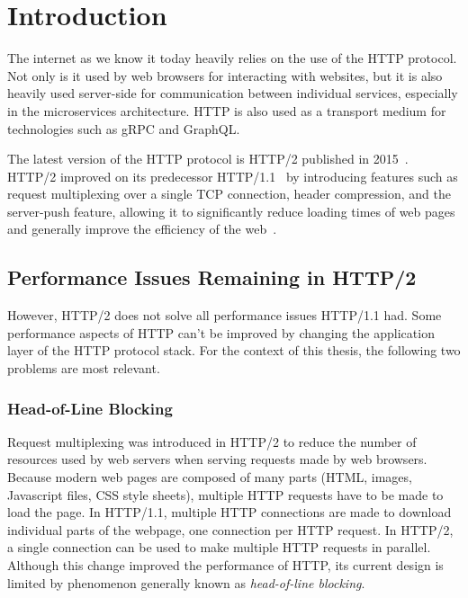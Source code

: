 \chapter{Introduction}

The internet as we know it today heavily relies on the use of the HTTP protocol. Not only is it used
by web browsers for interacting with websites, but it is also heavily used server-side for
communication between individual services, especially in the microservices architecture. HTTP is
also used as a transport medium for technologies such as gRPC and GraphQL\@. 

The latest version of the HTTP protocol is HTTP/2 published in 2015~\cite{rfc7540}. HTTP/2
improved on its predecessor HTTP/1.1~\cite{rfc7230} by introducing features such as request
multiplexing over a single TCP connection, header compression, and the server-push feature, allowing
it to significantly reduce loading times of web pages and generally improve the efficiency of the
web~\cite{deSaxce2015}.

\section{Performance Issues Remaining in HTTP/2}

However, HTTP/2 does not solve all performance issues HTTP/1.1 had. Some performance aspects of HTTP
can't be improved by changing the application layer of the HTTP protocol stack. For the context of
this thesis, the following two problems are most relevant.

\subsection*{Head-of-Line Blocking}

Request multiplexing was introduced in HTTP/2 to reduce the number of resources used by web servers
when serving requests made by web browsers. Because modern web pages are composed of many parts
(HTML, images, Javascript files, CSS style sheets), multiple HTTP requests have to be made to load
the page. In HTTP/1.1, multiple HTTP connections are made to download individual parts of the
webpage, one connection per HTTP request. In HTTP/2, a single connection can be used to make
multiple HTTP requests in parallel. Although this change improved the performance of HTTP, its
current design is limited by phenomenon generally known as \textit{head-of-line blocking}.

